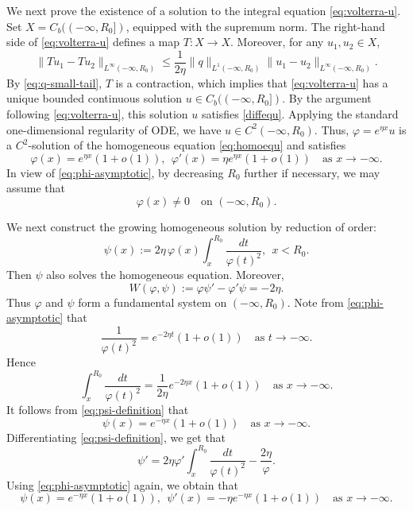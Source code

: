 \documentclass[11pt]{article}
\numberwithin{equation}{section}
\theoremstyle{definition}
\begin{document}
We next prove the existence of a solution to the integral equation
\eqref{eq:volterra-u}. Set \(X=C_b((-\infty,R_0])\), equipped with the supremum norm. The
right-hand side of \eqref{eq:volterra-u} defines a map \(T:X\to X\).
Moreover, for any \(u_1,u_2\in X\),
\[
\|Tu_1-Tu_2\|_{L^\infty(-\infty,R_0)}
\le
\frac{1}{2\eta}\|q\|_{L^1(-\infty,R_0)}
\|u_1-u_2\|_{L^\infty(-\infty,R_0)} .
\]
By \eqref{eq:q-small-tail}, \(T\) is a contraction, which implies that
\eqref{eq:volterra-u} has a unique bounded continuous solution
\(u\in C_b((-\infty,R_0])\).
By the argument following \eqref{eq:volterra-u}, this solution \(u\) satisfies \eqref{diffequ}. Applying the standard one-dimensional regularity of ODE, we have
\(u\in C^2(-\infty,R_0)\).
Thus,
\(\varphi=e^{\eta x}u\) is a \(C^2\)-solution of the homogeneous equation
\eqref{eq:homoequ} and satisfies
\begin{equation}\label{eq:phi-asymptotic}
	\varphi(x)=e^{\eta x}(1+o(1)),
	\ \
	\varphi'(x)=\eta e^{\eta x}(1+o(1))\quad \text{as }x\to-\infty.
\end{equation}
In view of \eqref{eq:phi-asymptotic}, by decreasing \(R_0\) further if necessary,
we may assume that
\[
\varphi(x)\neq0
\quad\text{on }(-\infty,R_0).
\]

	


We next construct the growing homogeneous solution by reduction of order:
\begin{equation}\label{eq:psi-definition}
	\psi(x)
	:=
	2\eta\,\varphi(x)\int_x^{R_0}\frac{dt}{\varphi(t)^2},
	\ \  x<R_0 .
\end{equation}
Then \(\psi\) also solves the homogeneous equation. Moreover,
\[
W(\varphi,\psi)
:=
\varphi\psi'-\varphi'\psi
=
-2\eta .
\]
Thus \(\varphi\) and \(\psi\) form a fundamental system on
\((-\infty,R_0)\). Note from \eqref{eq:phi-asymptotic} that
\[
\frac{1}{\varphi(t)^2}
=
e^{-2\eta t}(1+o(1))\quad \text{as }t\to-\infty.
\]
Hence
\[
\int_x^{R_0}\frac{dt}{\varphi(t)^2}
=
\frac{1}{2\eta}e^{-2\eta x}(1+o(1))\quad \text{as }x\to-\infty.
\]
It follows from \eqref{eq:psi-definition} that
\[
\psi(x)=e^{-\eta x}(1+o(1))\quad \text{as }x\to-\infty.
\]
Differentiating \eqref{eq:psi-definition}, we get that
\[
\psi'
=
2\eta\varphi'\int_x^{R_0}\frac{dt}{\varphi(t)^2}
-
\frac{2\eta}{\varphi}.
\]
Using \eqref{eq:phi-asymptotic} again, we obtain that
\begin{equation}\label{eq:psi-asymptotic}
	\psi(x)=e^{-\eta x}(1+o(1)),
	\ \
	\psi'(x)=-\eta e^{-\eta x}(1+o(1))\quad \text{as }x\to-\infty.
\end{equation}
\end{document}
